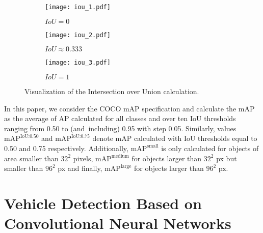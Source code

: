 \begin{figure}[h]
    \centering
    \begin{subfigure}[b]{0.3125\textwidth}
        \texttt{[image: iou\_1.pdf]}
        \caption{$IoU = 0$}
    \end{subfigure}
    \hfill
    \begin{subfigure}[b]{0.2272727\textwidth}
        \texttt{[image: iou\_2.pdf]}
        \caption{$IoU \approx 0.333$}
    \end{subfigure}
    \hfill
    \begin{subfigure}[b]{0.15151515\textwidth}
        \texttt{[image: iou\_3.pdf]}
        \caption{$IoU = 1$}
    \end{subfigure}

    \caption{Visualization of the Intersection over Union calculation.}
    \label{IoU}
\end{figure}

In this paper, we consider the COCO mAP specification and calculate the mAP as
the average of AP calculated for all classes and over ten IoU thresholds ranging
from \num{0.50} to (and~including) \num{0.95} with step \num{0.05}. Similarly,
values $\text{mAP}^{\text{IoU:0.50}}$ and $\text{mAP}^{\text{IoU:0.75}}$ denote
mAP calculated with IoU thresholds equal to \num{0.50} and \num{0.75}
respectively. Additionally, $\text{mAP}^{\text{small}}$ is only calculated for
objects of area smaller than $32^2$ pixels, $\text{mAP}^{\text{medium}}$ for
objects larger than $32^2$ px but smaller than $96^2$ px and finally,
$\text{mAP}^{\text{large}}$ for objects larger than $96^2$ px.




\section{Vehicle Detection Based on Convolutional Neural Networks}


